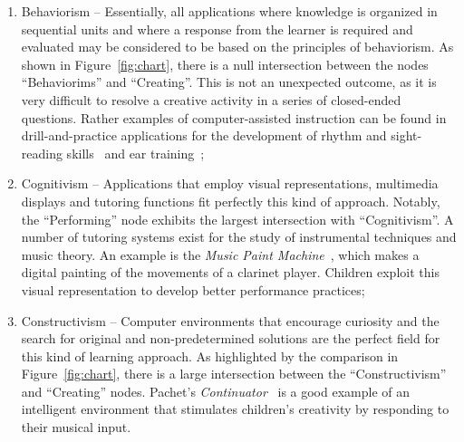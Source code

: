 \documentclass[10pt,journal,compsoc]{IEEEtran}
\newcommand{\node}[1]{{\fontfamily{cmss}\selectfont #1}}
\begin{document}
\begin{enumerate}[label=3.\arabic*.,leftmargin=0.7cm,listparindent=-\leftmargin, start=0]
\begin{enumerate}[label=3.0.\arabic*.,leftmargin=0.9cm,listparindent=-\leftmargin, start=0] 
\item \node{Behaviorism} --  Essentially, all applications where knowledge is organized in sequential units and where a response from the learner is required and evaluated may be considered to be based on the principles of behaviorism. As shown in Figure~\ref{fig:chart}, there is a null intersection between the nodes ``Behaviorims'' and ``Creating''. This is not an unexpected outcome, as it is very difficult to resolve a creative activity in a series of closed-ended questions. Rather examples of computer-assisted instruction can be found in drill-and-practice applications for the development of rhythm and sight-reading skills~\cite{smith} and ear training~\cite{loh};
%
\item \node{Cognitivism} -- Applications that employ visual representations, multimedia displays and tutoring functions fit perfectly this kind of approach. Notably, the ``Performing'' node exhibits the largest intersection with ``Cognitivism''. A number of tutoring systems exist for the study of instrumental techniques and music theory. An example is the \textit{Music Paint Machine}~\cite{nijs2012music}, which makes a digital painting of the movements of a clarinet player. Children exploit this visual representation to develop better performance practices;
%
\item \node{Constructivism} --  Computer environments that encourage curiosity and the search for original and non-predetermined solutions are the perfect field for this kind of learning approach. As highlighted by the comparison in Figure~\ref{fig:chart}, there is a large intersection between the ``Constructivism'' and ``Creating'' nodes. Pachet's \textit{Continuator}~\cite{addessi} is a good example of an intelligent environment that stimulates children's creativity by responding to their musical input.

\end{enumerate}


\end{enumerate}
\end{document}

